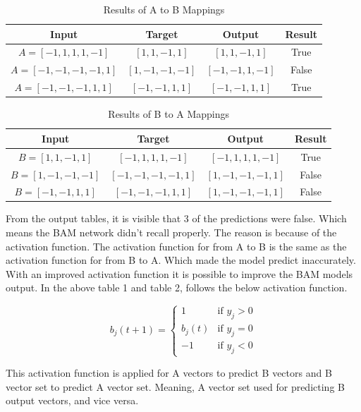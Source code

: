 \documentclass[12pt]{article}
\begin{document}
\begin{table}[ht]
    \centering
    \caption{Results of A to B Mappings}
    \begin{tabular}{|c|c|c|c|}
        \hline
        \textbf{Input} & \textbf{Target} & \textbf{Output} & \textbf{Result} \\ \hline
        $A = [-1, 1, 1, 1, -1]$ & $[1, 1, -1, 1]$ & $[1, 1, -1, 1]$ & True \\ \hline
        $A = [-1, -1, -1, -1, 1]$ & $[1, -1, -1, -1]$ & $[-1, -1, 1, -1]$ & False \\ \hline
        $A = [-1, -1, -1, 1, 1]$ & $[-1, -1, 1, 1]$ & $[-1, -1, 1, 1]$ & True \\ \hline
    \end{tabular}
\end{table}

\vspace{1cm} %

\begin{table}[ht]
    \centering
    \caption{Results of B to A Mappings}
    \begin{tabular}{|c|c|c|c|}
        \hline
        \textbf{Input} & \textbf{Target} & \textbf{Output} & \textbf{Result} \\ \hline
        $B = [1, 1, -1, 1]$ & $[-1, 1, 1, 1, -1]$ & $[-1, 1, 1, 1, -1]$ & True \\ \hline
        $B = [1, -1, -1, -1]$ & $[-1, -1, -1, -1, 1]$ & $[1, -1, -1, -1, 1]$ & False \\ \hline
        $B = [-1, -1, 1, 1]$ & $[-1, -1, -1, 1, 1]$ & $[1, -1, -1, -1, 1]$ & False \\ \hline
    \end{tabular}
\end{table}

From the output tables, it is visible that 3 of the predictions were false. Which means the BAM network didn't recall properly. The reason is because of the activation function. The activation function for from A to B is the same as the activation function for from B to A. Which made the model predict inaccurately. With an improved activation function it is possible to improve the BAM models output. In the above table 1 and table 2, follows the below activation function. 
\vspace{-1cm}
\begin{center}
\[
b_j(t+1) = 
\begin{cases} 
1 & \text{if } y_j > 0 \\ 
b_j(t) & \text{if } y_j = 0 \\ 
-1 & \text{if } y_j < 0 
\end{cases}
\]
\end{center}
This activation function is applied for A vectors to predict B vectors and B vector set to predict A vector set. Meaning, A vector set used for predicting B output vectors, and vice versa. 
\end{document}
